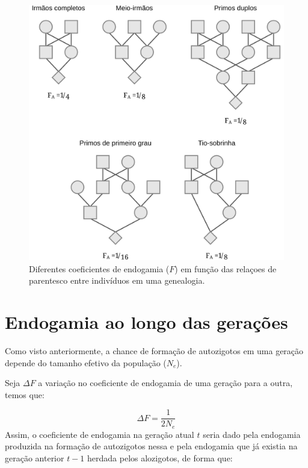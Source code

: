 \documentclass[
]{book}
\begin{document}
\begin{figure}

{\centering \includegraphics[width=600px]{figs/inbreeding_genealogies_examples} 

}

\caption{Diferentes coeficientes de endogamia ($F$) em função das relaçoes de parentesco entre indivíduos em uma genealogia.}\label{fig:Fpedigreeexamples}
\end{figure}

\hypertarget{endogamia-ao-longo-das-gerauxe7uxf5es}{%
\section{Endogamia ao longo das gerações}\label{endogamia-ao-longo-das-gerauxe7uxf5es}}

Como visto anteriormente, a chance de formação de autozigotos em uma geração depende do tamanho efetivo da população (\(N_e\)).

Seja \(\Delta F\) a variação no coeficiente de endogamia de uma geração para a outra, temos que:

\[\Delta F = \frac{1}{2N_e}\]
Assim, o coeficiente de endogamia na geração atual \(t\) seria dado pela endogamia produzida na formação de autozigotos nessa e pela endogamia que já existia na geração anterior \(t-1\) herdada pelos alozigotos, de forma que:
\end{document}
